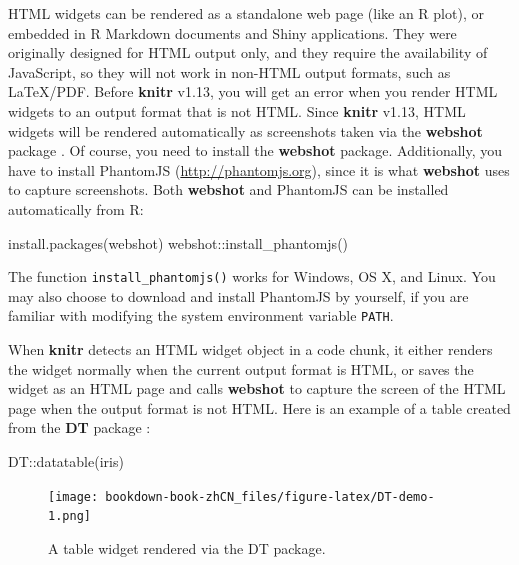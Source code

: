 \documentclass[
  12pt,
]{krantz}
\newenvironment{Shaded}{\begin{snugshade}}{\end{snugshade}}
\newcommand{\FunctionTok}[1]{\textcolor[rgb]{0.00,0.00,0.00}{#1}}
\newcommand{\NormalTok}[1]{#1}
\newcommand{\SpecialCharTok}[1]{\textcolor[rgb]{0.00,0.00,0.00}{#1}}
\newcommand{\StringTok}[1]{\textcolor[rgb]{0.31,0.60,0.02}{#1}}
\theoremstyle{definition}
\theoremstyle{definition}
\theoremstyle{definition}
\theoremstyle{definition}
\theoremstyle{remark}
\begin{document}
HTML widgets can be rendered as a standalone web page (like an R plot), or embedded in R Markdown documents and Shiny applications. They were originally designed for HTML output only, and they require the availability of JavaScript, so they will not work in non-HTML output formats, such as LaTeX/PDF. Before \textbf{knitr} v1.13, you will get an error when you render HTML widgets to an output format that is not HTML. Since \textbf{knitr} v1.13, HTML widgets will be rendered automatically as screenshots taken via the \textbf{webshot} package \citep{R-webshot}. Of course, you need to install the \textbf{webshot} package. Additionally, you have to install PhantomJS (\url{http://phantomjs.org}), since it is what \textbf{webshot} uses to capture screenshots. Both \textbf{webshot} and PhantomJS can be installed automatically from R:

\begin{Shaded}
\begin{Highlighting}[]
\FunctionTok{install.packages}\NormalTok{(}\StringTok{\textquotesingle{}webshot\textquotesingle{}}\NormalTok{)}
\NormalTok{webshot}\SpecialCharTok{::}\FunctionTok{install\_phantomjs}\NormalTok{()}
\end{Highlighting}
\end{Shaded}

The function \texttt{install\_phantomjs()} works for Windows, OS X, and Linux. You may also choose to download and install PhantomJS by yourself, if you are familiar with modifying the system environment variable \texttt{PATH}.

When \textbf{knitr} detects an HTML widget object in a code chunk, it either renders the widget normally when the current output format is HTML, or saves the widget as an HTML page and calls \textbf{webshot} to capture the screen of the HTML page when the output format is not HTML. Here is an example of a table created from the \textbf{DT} package \citep{R-DT}:

\begin{Shaded}
\begin{Highlighting}[]
\NormalTok{DT}\SpecialCharTok{::}\FunctionTok{datatable}\NormalTok{(iris)}
\end{Highlighting}
\end{Shaded}

\begin{figure}
\centering
\texttt{[image: bookdown-book-zhCN\_files/figure-latex/DT-demo-1.png]}
\caption{\label{fig:DT-demo}A table widget rendered via the DT package.}
\end{figure}
\end{document}
